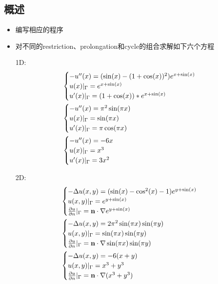 \documentclass{article}
\begin{document}
\subsection{概述}
\begin{itemize}
    \item 编写相应的程序
    \item 对不同的restriction、prolongation和cycle的组合求解如下六个方程
    
    1D:
    \begin{align}
        &\begin{cases}
            -u''(x) = (\sin(x)-(1+\cos(x))^2)e^{x+\sin(x)} \\
            u(x)|_{\Gamma} = e^{x+\sin(x)}\\
            u'(x)|_{\Gamma} = (1+\cos(x))*e^{x+\sin(x)} 
        \end{cases}\notag \\
        &\begin{cases}
            -u''(x) = \pi^2\sin(\pi x) \\
            u(x)|_{\Gamma} = \sin(\pi x)\\
            u'(x)|_{\Gamma}= \pi \cos(\pi x) 
        \end{cases}\notag \\
        &\begin{cases}
            -u''(x) = -6x \\
            u(x)|_{\Gamma} = x^3\\
            u'(x)|_{\Gamma} = 3x^2
        \end{cases}\notag
    \end{align}

    2D:
    \begin{align}
        &\begin{cases}
            -\Delta u(x,y) = (\sin(x)-\cos^2(x)-1)e^{y+\sin(x)} \\
            u(x,y)|_{\Gamma} = e^{y+\sin(x)}\\
            \frac{\partial u}{\partial n}|_{\Gamma} = \mathbf{n}\cdot \nabla e^{y+\sin(x)} 
        \end{cases}\notag \\
        &\begin{cases}
            -\Delta u(x,y) = 2\pi^2\sin(\pi x)\sin(\pi y) \\
            u(x,y)|_{\Gamma} = \sin(\pi x)\sin(\pi y)\\
            \frac{\partial u}{\partial n}|_{\Gamma} = \mathbf{n}\cdot \nabla \sin(\pi x)\sin(\pi y) 
        \end{cases}\notag \\
        &\begin{cases}
            -\Delta u(x,y) = -6(x+y) \\
            u(x,y)|_{\Gamma} = x^3+y^3\\
            \frac{\partial u}{\partial n}|_{\Gamma} = \mathbf{n}\cdot \nabla (x^3+y^3) 
        \end{cases}\notag
    \end{align}
        

\end{itemize}
\end{document}
